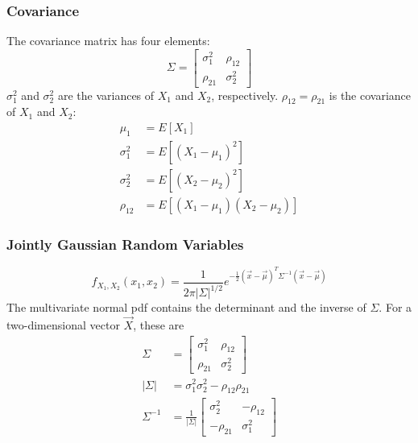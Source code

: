 \documentclass{beamer}
\begin{document}
\begin{frame}
  \frametitle{Covariance}
  The covariance matrix has four elements:
  \[
  \Sigma = \left[\begin{array}{cc}\sigma_1^2 & \rho_{12} \\\rho_{21} & \sigma_2^2\end{array}\right]
  \]
  $\sigma_1^2$ and $\sigma_2^2$ are the variances of $X_1$ and $X_2$, respectively.
  $\rho_{12}=\rho_{21}$ is the covariance of $X_1$ and $X_2$:
  \begin{align*}
    \mu_1 & = E[X_1]\\
    \sigma_1^2 &= E\left[(X_1-\mu_1)^2\right]\\
    \sigma_2^2 &= E\left[(X_2-\mu_2)^2\right]\\
    \rho_{12} &= E\left[(X_1-\mu_1)(X_2-\mu_2)\right]
  \end{align*}
\end{frame}

\begin{frame}
  \frametitle{Jointly Gaussian Random Variables}
  \[
  f_{X_1,X_2}(x_1,x_2) = \frac{1}{2\pi|\Sigma|^{1/2}}
  e^{-\frac{1}{2}(\vec{x}-\vec\mu)^T\Sigma^{-1}(\vec{x}-\vec\mu)}
  \]
  The multivariate normal pdf contains the determinant and the inverse of $\Sigma$.
  For a two-dimensional vector $\vec{X}$, these are
  \begin{align*}
    \Sigma &= \left[\begin{array}{cc}\sigma_1^2 & \rho_{12} \\\rho_{21} & \sigma_2^2\end{array}\right]\\
    |\Sigma| &=\sigma_1^2\sigma_2^2 - \rho_{12}\rho_{21}\\
    \Sigma^{-1} &= \frac{1}{|\Sigma|}\left[\begin{array}{cc}
        \sigma_2^2 & -\rho_{12}\\-\rho_{21} & \sigma_1^2\end{array}\right]
  \end{align*}
\end{frame}  
  
\end{document}
